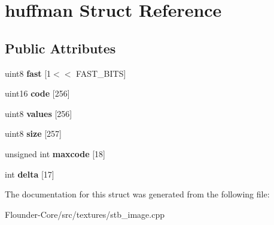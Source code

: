 \hypertarget{structhuffman}{}\section{huffman Struct Reference}
\label{structhuffman}
\subsection*{Public Attributes}
\begin{DoxyCompactItemize}
\item 
\mbox{\label{structhuffman_a9dbb29a8ed724a32f502d9595510ddc2}} 
uint8 {\bfseries fast} \mbox{[}1$<$$<$ F\+A\+S\+T\+\_\+\+B\+I\+TS\mbox{]}
\item 
\mbox{\label{structhuffman_a9925018a95d5a2122cd732561fa0fa64}} 
uint16 {\bfseries code} \mbox{[}256\mbox{]}
\item 
\mbox{\label{structhuffman_a313d78cf23f40b314c25681ff2a6224b}} 
uint8 {\bfseries values} \mbox{[}256\mbox{]}
\item 
\mbox{\label{structhuffman_afdb0fbcf25aec42ba30b0d0e2453a057}} 
uint8 {\bfseries size} \mbox{[}257\mbox{]}
\item 
\mbox{\label{structhuffman_aeb78aca6c7377faaad8123566d54fc98}} 
unsigned int {\bfseries maxcode} \mbox{[}18\mbox{]}
\item 
\mbox{\label{structhuffman_a04255e3e1c6de74d36a08a1aa4e9537d}} 
int {\bfseries delta} \mbox{[}17\mbox{]}
\end{DoxyCompactItemize}


The documentation for this struct was generated from the following file\+:\begin{DoxyCompactItemize}
\item 
Flounder-\/\+Core/src/textures/stb\+\_\+image.\+cpp\end{DoxyCompactItemize}
